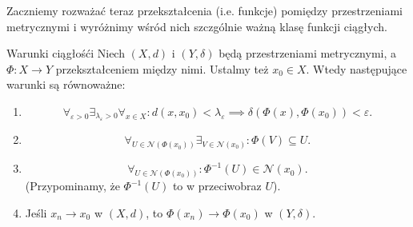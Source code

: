 \documentclass{article}
\numberwithin{defi}{section}
\numberwithin{theo}{section}
\numberwithin{defi}{section}
\newcommand{\eps}{\varepsilon}
\newcommand{\Nau}{\mathcal{N}}
\begin{document}
Zaczniemy rozważać teraz przekształcenia (i.e. funkcje) pomiędzy przestrzeniami metrycznymi i wyróżnimy wśród nich szczgólnie ważną klasę funkcji ciągłych.

\begin{twier}{Warunki ciągłośći} \label{twier:warunki-ciaglosci}
    Niech $(X, d)$ i $(Y, \delta)$ będą przestrzeniami metrycznymi, a $\Phi : X \to Y$ przekształceniem między nimi. Ustalmy też $x_0 \in X$. Wtedy następujące warunki są równoważne:
    \begin{enumerate}
        \item \begin{equation}
                  \forall_{\eps > 0} \exists_{\lambda_\eps >0} \forall_{x \in X}: d(x, x_0) < \lambda_\eps \implies \delta(\Phi(x), \Phi(x_0)) < \eps.
              \end{equation}
        \item \begin{equation}
                  \forall_{U \in \Nau(\Phi(x_0))} \exists_{V \in \Nau(x_0)}: \Phi(V) \subseteq U.
              \end{equation}
        \item \begin{equation}
                  \forall_{U \in \Nau(\Phi(x_0))}: \Phi^{-1}(U) \in \Nau(x_0).
              \end{equation} (Przypominamy, że $\Phi^{-1}(U)$ to w przeciwobraz $U$).
        \item Jeśli $x_n \to x_0$ w $(X, d)$, to $\Phi(x_n) \to \Phi(x_0)$ w $(Y, \delta)$.
    \end{enumerate}
\end{twier}
\end{document}
